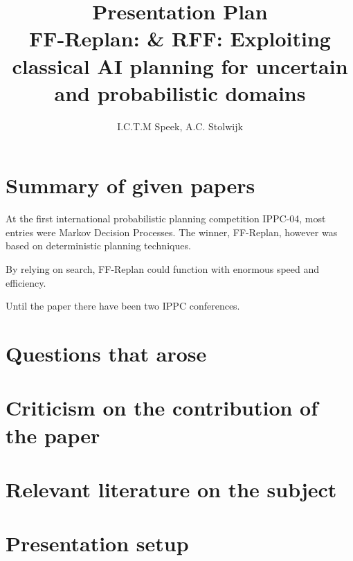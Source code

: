 \documentclass[runningheads,a4paper]{llncs}
\begin{document}
\mainmatter%

\title{Presentation Plan\\
FF-Replan: \& RFF\@: Exploiting classical AI planning for uncertain and probabilistic domains}


\author{I.C.T.M Speek, A.C. Stolwijk}

%


\maketitle

\section{Summary of given papers}

At the first international probabilistic planning competition IPPC-04, most
entries were Markov Decision Processes. The winner, FF-Replan, however was
based on deterministic planning techniques.

By relying on search, FF-Replan could function with enormous speed and efficiency.

Until the paper there have been two IPPC conferences.

\section{Questions that arose}

\section{Criticism on the contribution of the paper}

\section{Relevant literature on the subject}

\section{Presentation setup}
\end{document}
